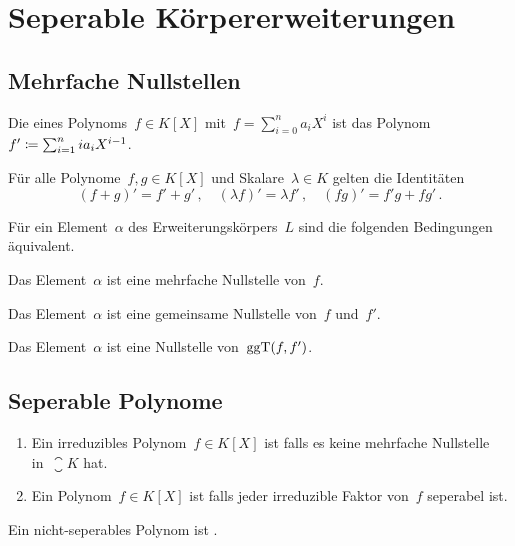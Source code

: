 \section{Seperable Körpererweiterungen}



\subsection{Mehrfache Nullstellen}

\begin{definition}
  Die  eines Polynoms~$f \in K[X]$ mit~$f = \sum_{i=0}^n a_i X^i$ ist das Polynom~$f' \coloneqq \sum_{i=1}^n i a_i X^{i-1}$.
\end{definition}

\begin{lemma}
  Für alle Polynome~$f, g \in K[X]$ und Skalare~$\lambda \in K$ gelten die Identitäten
  \[
    (f + g)' = f' + g' \,,
    \quad
    (\lambda f)' = \lambda f' \,,
    \quad
    (fg)' = f' g + f g' \,.
  \]
\end{lemma}

\begin{proposition}
  \label{characterizations of multiple roots}
  Für ein Element~$\alpha$ des Erweiterungskörpers~$L$ sind die folgenden Bedingungen äquivalent.
  \begin{equivlist}
    \item
      Das Element~$\alpha$ ist eine mehrfache Nullstelle von~$f$.
    \item
      Das Element~$\alpha$ ist eine gemeinsame Nullstelle von~$f$ und~$f'$.
    \item
      Das Element~$\alpha$ ist eine Nullstelle von~$\operatorname{ggT}(f,f')$.
  \end{equivlist}
\end{proposition}



\subsection{Seperable Polynome}

\begin{definition}
  \leavevmode
  \begin{enumerate}
    \item
      Ein irreduzibles Polynom~$f \in K[X]$ ist  falls es keine mehrfache Nullstelle in~$\closure{K}$ hat.
    \item
      Ein Polynom~$f \in K[X]$ ist  falls jeder irreduzible Faktor von~$f$ seperabel ist.
  \end{enumerate}
  Ein nicht-seperables Polynom ist .
\end{definition}

